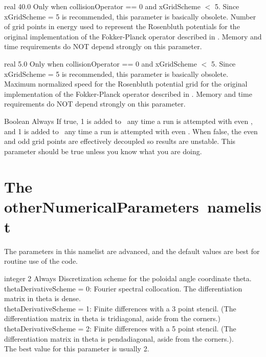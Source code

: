 \myhrule

{real}
{40.0}
{Only when {\ttfamily collisionOperator} == 0 and {\ttfamily xGridScheme} $<$ 5.
Since {\ttfamily xGridScheme} = 5 is recommended, this parameter is basically obsolete.}
{
Number of grid points in energy used to represent the Rosenbluth potentials
for the original implementation of the Fokker-Planck operator described in \cite{speedGrids}.
Memory and time requirements do NOT depend strongly on this parameter.}

\myhrule

{real}
{5.0}
{Only when {\ttfamily collisionOperator} == 0 and {\ttfamily xGridScheme} $<$ 5.
Since {\ttfamily xGridScheme} = 5 is recommended, this parameter is basically obsolete.}
{
Maximum normalized speed for the Rosenbluth potential grid
for the original implementation of the Fokker-Planck operator described in \cite{speedGrids}.
Memory and time requirements do NOT depend strongly on this parameter.}

\myhrule

{Boolean}
{\true}
{Always}
{
If true, 1 is added to \Ntheta~any time a run is attempted with even \Ntheta,
and 1 is added to \Nzeta~any time a run is attempted with even \Nzeta.
When false, the even and odd grid points are effectively decoupled so results are unstable.
This parameter should be true unless you know what you are doing.
}














\section{The {\ttfamily otherNumericalParameters}~namelist}

The parameters in this namelist are advanced, and the default values are best for routine use of the code.

\myhrule

{integer}
{2}
{Always}
{Discretization scheme for the poloidal angle coordinate theta.\\

{\ttfamily thetaDerivativeScheme} = 0: Fourier spectral collocation.  The differentiation matrix in theta is dense.\\

{\ttfamily thetaDerivativeScheme} = 1: Finite differences with a 3 point stencil.  (The differentiation matrix in theta is tridiagonal, aside from the corners.)\\

{\ttfamily thetaDerivativeScheme} = 2: Finite differences with a 5 point stencil.  (The differentiation matrix in theta is pendadiagonal, aside from the corners.).\\

The best value for this parameter is usually 2.}



